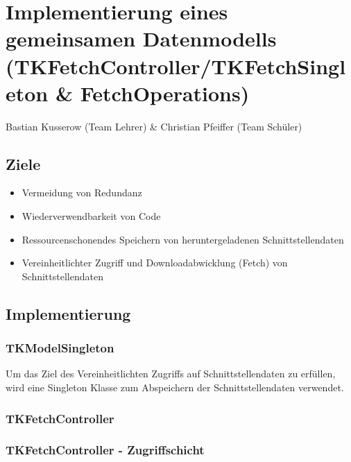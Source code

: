 \chapter{Implementierung eines gemeinsamen Datenmodells (TKFetchController/TKFetchSingleton \& FetchOperations)}
Bastian Kusserow (Team Lehrer) \& Christian Pfeiffer (Team Schüler)
\section{Ziele}


\begin{itemize}
\item Vermeidung von Redundanz
\item Wiederverwendbarkeit von Code
\item Ressourcenschonendes Speichern von heruntergeladenen Schnittstellendaten
\item Vereinheitlichter Zugriff und Downloadabwicklung (Fetch) von Schnittstellendaten
\end{itemize}

\section{Implementierung}

\subsection{TKModelSingleton}
Um das Ziel des Vereinheitlichten Zugriffs auf Schnittstellendaten zu erfüllen, wird eine Singleton Klasse zum Abspeichern der Schnittstellendaten verwendet.



\subsection{TKFetchController}



\subsection{TKFetchController - Zugriffschicht}

